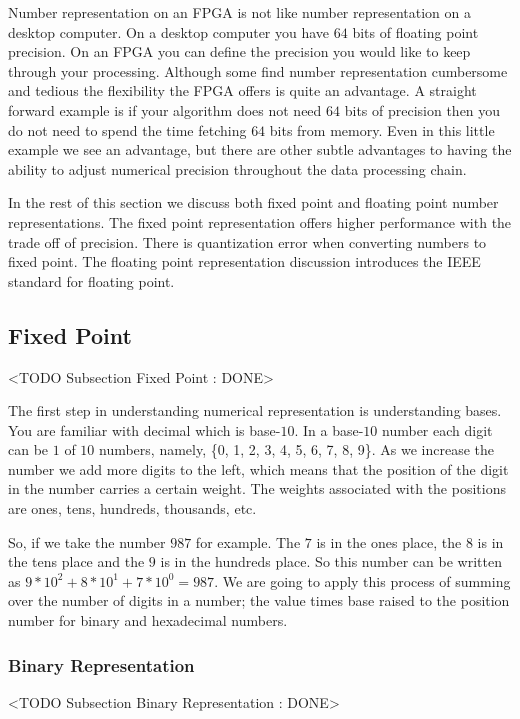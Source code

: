 Number representation on an \ac{FPGA} is not like number representation on a desktop computer. On a desktop computer you have $64$ bits of floating point precision. On an \ac{FPGA} you can define the precision you would like to keep through your processing. Although some find number representation cumbersome and tedious the flexibility the \ac{FPGA} offers is quite an advantage. A straight forward example is if your algorithm does not need $64$ bits of precision then you do not need to spend the time fetching $64$ bits from memory. Even in this little example we see an advantage, but there are other subtle advantages to having the ability to adjust numerical precision throughout the data processing chain.

In the rest of this section we discuss both fixed point and floating point number representations. The fixed point representation offers higher performance with the trade off of precision. There is quantization error when converting numbers to fixed point. The floating point representation discussion introduces the \ac{IEEE} standard for floating point.
	
\subsection{Fixed Point}
	<TODO Subsection Fixed Point : DONE>

The first step in understanding numerical representation is understanding bases. You are familiar with decimal which is base-$10$. In a base-$10$ number each digit can be $1$ of $10$ numbers, namely, \{0, 1, 2, 3, 4, 5, 6, 7, 8, 9\}. As we increase the number we add more digits to the left, which means that the position of the digit in the number carries a certain weight. The weights associated with the positions are ones, tens, hundreds, thousands, etc.

So, if we take the number $987$ for example. The $7$ is in the ones place, the $8$ is in the tens place and the $9$ is in the hundreds place. So this number can be written as $9*10^2 + 8*10^1 + 7*10^0 = 987$. We are going to apply this process of summing over the number of digits in a number; the value times base raised to the position number for binary and hexadecimal numbers. 

\subsubsection{Binary Representation}
	<TODO Subsection Binary Representation : DONE>
	
